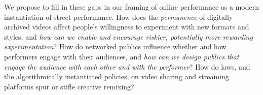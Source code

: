 \documentclass[10pt]{article}
\newcommand{\topic}[1]{{\color{Blue}#1}}
\renewcommand{\topic}[1]{{#1}}
\begin{document}
\topic{We propose to fill in these gaps in our framing of online performance as a modern instantiation of street performance.}
How does the \textit{permanence} of digitally archived videos affect people's willingness to experiment with new formats and styles,
and \textit{how can we enable and encourage riskier, potentially more rewarding experimentation}?
How do networked publics influence whether and how performers engage with their audiences,
and \textit{how can we design publics that engage the audience with each other and with the performer}?
How do laws, and the algorithmically instantiated policies, on video sharing and streaming platforms spur or stifle creative remixing?


\end{document}
